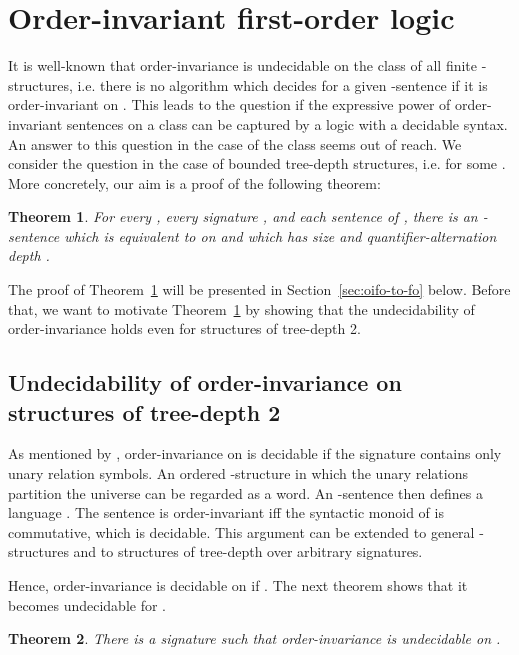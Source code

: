 \documentclass[11pt]{article}
\newtheorem{theorem}{Theorem}
\begin{document}
\section{Order-invariant first-order logic}
\label{sec:oifo}

It is well-known that order-invariance is undecidable on the class 
of all finite -structures, i.e.  there is no algorithm which decides for
a given -sentence if it is order-invariant on
. This leads to the question if the expressive power of
order-invariant sentences on a class  can be captured by a logic with
a decidable syntax.  An answer to this question in the case of the class
 seems out of reach.  We consider the question in the case of
bounded tree-depth structures, i.e.  for some .  More concretely, our aim is a proof of the following theorem:

\begin{theorem}
  \label{thm:oifo-eq-fo}
  For every , every signature , and each sentence
   of , there is an -sentence 
  which is equivalent to  on  and which has
  size  and quantifier-alternation
  depth .
\end{theorem}

The proof of Theorem~\ref{thm:oifo-eq-fo} will be presented in
Section~\ref{sec:oifo-to-fo} below. Before that, we want to motivate
Theorem~\ref{thm:oifo-eq-fo} by showing that the undecidability of
order-invariance holds even for structures of tree-depth 2.

\subsection{Undecidability of order-invariance on structures of tree-depth 2}
\label{sec:undecidability}

As mentioned by \cite{Schweikardt2013}, order-invariance on  is
decidable if the signature  contains only unary relation symbols.  An
ordered -structure in which the unary relations partition the universe
can be regarded as a word. An -sentence  then defines
a language . The sentence  is order-invariant iff the syntactic
monoid of  is commutative, which is decidable.  This argument can be
extended to general -structures and to structures of tree-depth  over
arbitrary signatures.

Hence, order-invariance is decidable on  if . The next
theorem shows that it becomes undecidable for .

\begin{theorem}
  \label{thm:ordinv-undecidable}
  There is a signature  such that order-invariance is undecidable on .
\end{theorem}
\end{document}
